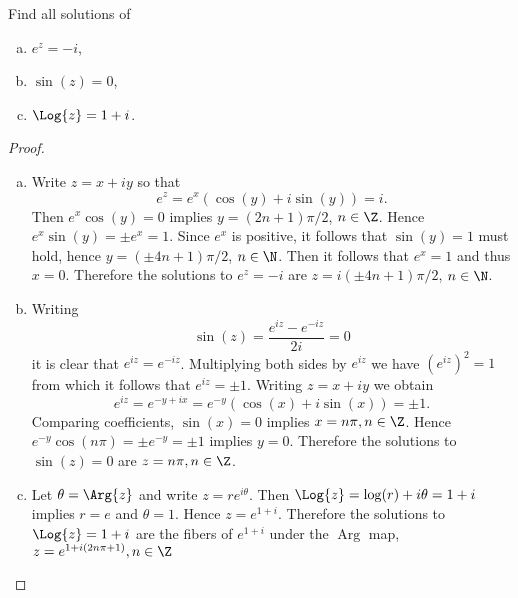 \documentclass[12pt]{amsart}
\begin{document}
\begin{thm}
  Find all solutions of 
  \begin{enumerate}[(a)]
  \item
    $e^z = -i$,
  \item
    $\sin(z) = 0$,
  \item
    $\Log{z} = 1 + i$.
  \end{enumerate}
  
  \begin{proof}
    \begin{enumerate}[(a)]
    \item
      Write $z = x + iy$ so that $$e^z = e^x(\cos(y) + i\sin(y)) = i.$$
      Then $e^x\cos(y) = 0$ implies $y = (2n+1)\pi/2$, $n \in \Z$.
      Hence $e^x\sin(y) = \pm e^x = 1$.
      Since $e^x$ is positive, it follows that $\sin(y) = 1$ must hold, hence $y = (\pm 4n + 1)\pi/2$, $n \in \N$.
      Then it follows that $e^x = 1$ and thus $x = 0$.
      Therefore the solutions to $e^z = -i$ are $z = i(\pm 4n + 1)\pi/2$, $n \in \N$.
    \item
      Writing $$\sin(z) = \frac{e^{iz} - e^{-iz}}{2i} = 0$$
      it is clear that $e^{iz} = e^{-iz}$.
      Multiplying both sides by $e^{iz}$ we have $(e^{iz})^2 = 1$ from which it follows that $e^{iz} = \pm 1$.
      Writing $z = x + iy$ we obtain $$e^{iz} = e^{-y + ix} = e^{-y}(\cos(x) + i\sin(x)) = \pm 1.$$
      Comparing coefficients, $\sin(x) = 0$ implies $x = n\pi, n \in \Z$.
      Hence $e^{-y}\cos(n\pi) = \pm e^{-y} = \pm {1}$ implies $y = 0$.
      Therefore the solutions to $\sin(z) = 0$ are $z = n\pi, n \in \Z$.
    \item
      Let $\theta = \Arg{z}$ and write $z = re^{i\theta}$.
      Then $\Log{z} = \log(r) + i\theta = 1 + i$ implies $r = e$ and $\theta = 1$.
      Hence $z = e^{1 + i}$.
      Therefore the solutions to $\Log{z} = 1 + i$ are the fibers of $e^{1 + i}$ under the $\operatorname{Arg}$ map, $z = e^{1 + i(2n\pi + 1)}, n \in \Z$
    \end{enumerate}
  \end{proof}
\end{thm}
\end{document}
